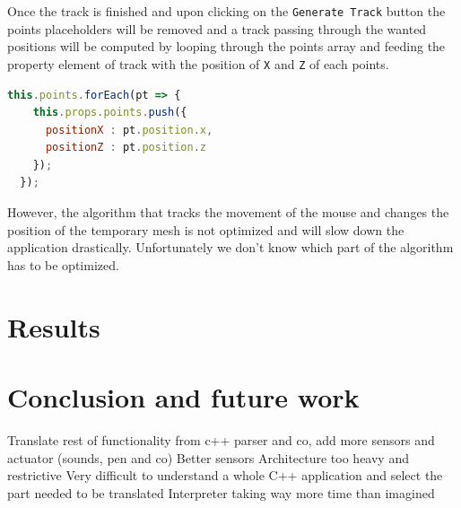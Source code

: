 \documentclass{scrbook}
\begin{document}
Once the track is finished and upon clicking on the \texttt{Generate Track} button the points placeholders will be removed and a track passing through the wanted positions will be computed by looping through the points array and feeding the property element of track with the position of \texttt{X} and \texttt{Z} of each points.
\begin{lstlisting}[language=JavaScript, basicstyle=\ttfamily\small]
  this.points.forEach(pt => {                      
    this.props.points.push({
      positionX : pt.position.x,
      positionZ : pt.position.z
    });
  });
\end{lstlisting} 
However, the algorithm that tracks the movement of the mouse and changes the position of the temporary mesh is not optimized and will slow down the application drastically. Unfortunately we don't know which part of the algorithm has to be optimized.


\chapter{Results}



                

\chapter{Conclusion and future work}
Translate rest of functionality from c++ parser and co, add more sensors and actuator (sounds, pen and co)
Better sensors
Architecture too heavy and restrictive
Very difficult to understand a whole C++ application and select the part needed to be translated
Interpreter taking way more time than imagined
\end{document}
